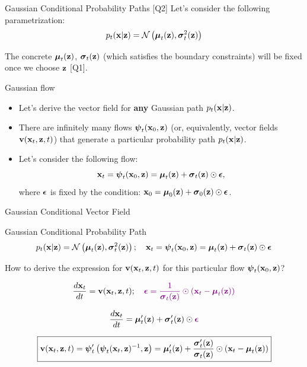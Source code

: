 \documentclass{beamer}
\renewcommand{\eqpause}{}
\begin{document}
\begin{frame}{Gaussian Conditional Probability Paths [Q2]}
	Let's consider the following parametrization:
	\vspace{-0.3cm}
	\[
		p_t(\mathbf{x} | \mathbf{z}) = \mathcal{N}\left(\boldsymbol{\mu}_t(\mathbf{z}), \boldsymbol{\sigma}_t^2(\mathbf{z}) \right)
	\]
	\eqpause
	The concrete $\boldsymbol{\mu}_t(\mathbf{z})$, $\boldsymbol{\sigma}_t(\mathbf{z})$ (which satisfies the boundary constraints) will be fixed once we choose $\mathbf{z}$ [Q1].
	\begin{block}{Gaussian flow}
		\begin{itemize}
			\item Let's derive the vector field for \textbf{any} Gaussian path $p_t(\mathbf{x} | \mathbf{z})$.
			\item There are infinitely many flows $\boldsymbol{\psi}_t(\mathbf{x}_0, \mathbf{z})$ (or, equivalently, vector fields $\mathbf{v}(\mathbf{x}_t, \mathbf{z}, t)$) that generate a particular probability path $p_t(\mathbf{x} | \mathbf{z})$.
			\eqpause
			\item Let's consider the following flow:
			\vspace{-0.3cm}
			\[
				\mathbf{x}_t = \boldsymbol{\psi}_t(\mathbf{x}_0, \mathbf{z}) = \boldsymbol{\mu}_t(\mathbf{z}) + \boldsymbol{\sigma}_t(\mathbf{z}) \odot \boldsymbol{\epsilon},
			\]
			where $\boldsymbol{\epsilon}$ is fixed by the condition: $\mathbf{x}_0 = \boldsymbol{\mu}_0(\mathbf{z}) + \boldsymbol{\sigma}_0(\mathbf{z}) \odot \boldsymbol{\epsilon}$.
		\end{itemize}
	\end{block}
\end{frame}
\begin{frame}{Gaussian Conditional Vector Field}
	\begin{block}{Gaussian Conditional Probability Path}
		\vspace{-0.5cm}
		\[
			p_t(\mathbf{x} | \mathbf{z}) = \mathcal{N}\left(\boldsymbol{\mu}_t(\mathbf{z}), \boldsymbol{\sigma}_t^2(\mathbf{z})\right); \quad \mathbf{x}_t = \boldsymbol{\psi}_t(\mathbf{x}_0, \mathbf{z}) = \boldsymbol{\mu}_t(\mathbf{z}) + \boldsymbol{\sigma}_t(\mathbf{z}) \odot \boldsymbol{\epsilon}
		\]
		\vspace{-0.5cm}
	\end{block}
	\eqpause
	How to derive the expression for $\mathbf{v}(\mathbf{x}_t, \mathbf{z}, t)$ for this particular flow $\boldsymbol{\psi}_t(\mathbf{x}_0, \mathbf{z})$?
	\eqpause
	\vspace{-0.3cm}
	\[
		\frac{d\mathbf{x}_t}{dt} = \mathbf{v}(\mathbf{x}_t, \mathbf{z}, t); \quad {\color{violet}\boldsymbol{\epsilon}= \frac{1}{\boldsymbol{\sigma}_t(\mathbf{z})} \odot (\mathbf{x}_t - \boldsymbol{\mu}_t(\mathbf{z}))}
	\]
	\eqpause
	\[
		\frac{d\mathbf{x}_t}{dt} = \boldsymbol{\mu}_t'(\mathbf{z}) + \boldsymbol{\sigma}_t'(\mathbf{z}) \odot {\color{violet}\boldsymbol{\epsilon}} 
	\]
	\eqpause
	\[
		\boxed{\mathbf{v}(\mathbf{x}_t, \mathbf{z}, t) = \boldsymbol{\psi}_t'\left(\boldsymbol{\psi}_t(\mathbf{x}_t, \mathbf{z})^{-1}, \mathbf{z}\right) = \boldsymbol{\mu}_t'(\mathbf{z}) + \frac{\boldsymbol{\sigma}_t'(\mathbf{z})}{\boldsymbol{\sigma}_t(\mathbf{z})} \odot (\mathbf{x}_t - \boldsymbol{\mu}_t(\mathbf{z}))}
	\]
\end{frame}
\end{document}
